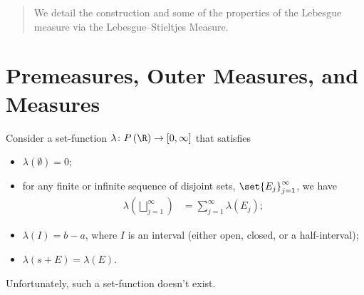 \documentclass[10pt]{mypackage}
\begin{document}
\RaggedRight
\begin{abstract}
  \noindent We detail the construction and some of the properties of the Lebesgue measure via the Lebesgue--Stieltjes Measure.
\end{abstract}
\section{Premeasures, Outer Measures, and Measures}%
Consider a set-function $\lambda\colon P\left( \R \right)\rightarrow [0,\infty]$ that satisfies
\begin{itemize}
  \item $\lambda\left( \emptyset \right) = 0$;
  \item for any finite or infinite sequence of disjoint sets, $\set{E_j}_{j=1}^{\infty}$, we have
    \begin{align*}
      \lambda\left( \bigsqcup_{j=1}^{\infty} \right) &= \sum_{j=1}^{\infty}\lambda\left( E_j \right);
    \end{align*}
  \item $\lambda\left( I \right) = b - a$, where $I$ is an interval (either open, closed, or a half-interval);
  \item $\lambda\left( s + E \right) = \lambda\left( E \right)$.
\end{itemize}
Unfortunately, such a set-function doesn't exist.\newline
\end{document}
